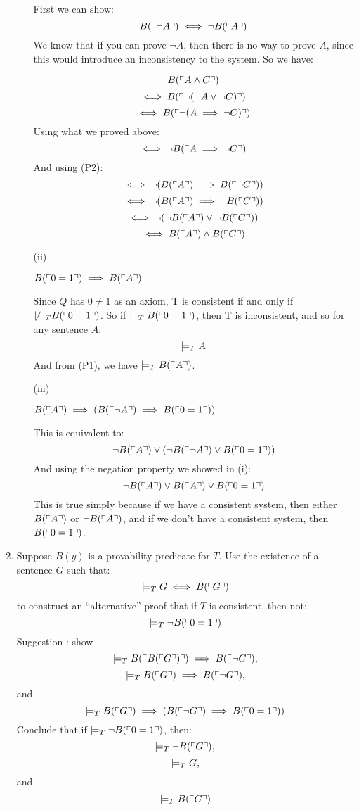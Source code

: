 \begin{enumerate}
\begin{enumerate}
        First we can show:
        $$B(\ulcorner \neg A \urcorner) \iff \neg B(\ulcorner A \urcorner)$$
        We know that if you can prove $\neg A$, then there is no way to prove $A$, since this would introduce an inconsistency to the system. So we have:

        $$B(\ulcorner A \land C \urcorner)$$
        $$\iff B(\ulcorner \neg (\neg A \lor \neg C) \urcorner)$$
        $$\iff B(\ulcorner \neg (A \implies \neg C) \urcorner)$$
        Using what we proved above:
        $$\iff \neg B(\ulcorner A \implies \neg C \urcorner)$$
        And using (P2):
        $$\iff \neg (B(\ulcorner A \urcorner) \implies B(\ulcorner \neg C \urcorner))$$
        $$\iff \neg (B(\ulcorner A \urcorner) \implies \neg B(\ulcorner C \urcorner))$$
        $$\iff \neg (\neg B(\ulcorner A \urcorner) \lor \neg B(\ulcorner C \urcorner))$$
        $$\iff B(\ulcorner A \urcorner) \land B(\ulcorner C \urcorner)$$
      \item [(ii)]
        \begin{question}
          $B(\ulcorner 0=1 \urcorner) \implies B(\ulcorner A \urcorner)$
        \end{question}

        Since $Q$ has $0 \neq 1$ as an axiom, T is consistent if and only if $\centernot \tarski_T B(\brak{0=1})$. So if $\mathrel{|}\!=_T B(\ulcorner 0=1 \urcorner)$, then T is inconsistent, and so for any sentence $A$:
        $$\mathrel{|}\!=_T A$$
        And from (P1), we have $\mathrel{|}\!=_T B(\ulcorner A \urcorner)$.
      \item [(iii)]
        \begin{question}
          $B(\ulcorner A \urcorner) \implies (B(\ulcorner \neg A \urcorner) \implies B(\ulcorner 0=1 \urcorner))$
        \end{question}

        This is equivalent to:
        $$\neg B(\ulcorner A \urcorner) \lor (\neg B(\ulcorner \neg A \urcorner) \lor B(\ulcorner 0=1 \urcorner))$$
        And using the negation property we showed in (i):
        $$\neg B(\ulcorner A \urcorner) \lor B(\ulcorner A \urcorner) \lor B(\ulcorner 0=1 \urcorner)$$
        This is true simply because if we have a consistent system, then either $B(\ulcorner A \urcorner)$ or $\neg B(\ulcorner A \urcorner)$, and if we don't have a consistent system, then $B(\ulcorner 0=1 \urcorner)$.
    \end{enumerate}


  \item
    \begin{question}
      Suppose $B(y)$ is a provability predicate for $T$. Use the existence of a sentence $G$ such that:
      $$\mathrel{|}\!=_T G \iff B(\ulcorner G \urcorner)$$
      to construct an ``alternative'' proof that if $T$ is consistent, then not:
      $$\mathrel{|}\!=_T \neg B(\ulcorner 0=1 \urcorner)$$
      Suggestion : show
      $$\mathrel{|}\!=_T B(\ulcorner B(\ulcorner G \urcorner) \urcorner) \implies B(\ulcorner \neg G \urcorner),$$
      $$\mathrel{|}\!=_T B(\ulcorner G \urcorner) \implies B(\ulcorner \neg G \urcorner),$$ and
      $$\mathrel{|}\!=_T B(\ulcorner G \urcorner) \implies (B(\ulcorner \neg G \urcorner) \implies B(\ulcorner 0=1 \urcorner))$$
      Conclude that if $\mathrel{|}\!=_T \neg B(\ulcorner 0=1 \urcorner)$, then:
      $$\mathrel{|}\!=_T \neg B(\ulcorner G \urcorner),$$
      $$\mathrel{|}\!=_T G,$$ and
      $$\mathrel{|}\!=_T B(\ulcorner G \urcorner)$$
    \end{question}


\end{enumerate}

